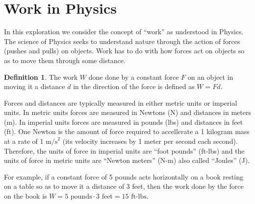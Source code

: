 \documentclass[12pt,letterpaper,fleqn]{article}
\theoremstyle{definition}
\newtheorem*{definition}{Definition}
\begin{document}
\section*{Work in Physics}
In this exploration we consider the concept of ``work'' as understood in Physics. The science of Physics seeks to understand nature through the action of forces (pushes and pulls) on objects. Work has to do with how forces act on objects so as to move them through some distance.

\begin{definition}
 The work $W$ done done by a constant force $F$ on an object in moving it a distance $d$ in the direction of the force is defined as $W = Fd$.
\end{definition}

Forces and distances are typically measured in either metric units or imperial units. In metric units forces are measured in Newtons (N) and distances in meters (m). In imperial units forces are measured in pounds (lbs) and distances in feet (ft). One Newton is the amount of force required to accellerate a 1 kilogram mass at a rate of 1 $\text{m/s}^2$ (its velocity increases by 1 meter per second each second). Therefore, the units of force in imperial units are ``foot pounds'' (ft-lbs) and the units of force in metric units are ``Newton meters'' (N-m) also called ``Joules'' (J).

For example, if a constant force of 5 pounds acts horizontally on a book resting on a table so as to move it a distance of 3 feet, then the work done by the force on the book is $W = 5\text{ pounds} \cdot 3\text{ feet} = 15 \text{ ft-lbs}$.
\end{document}
